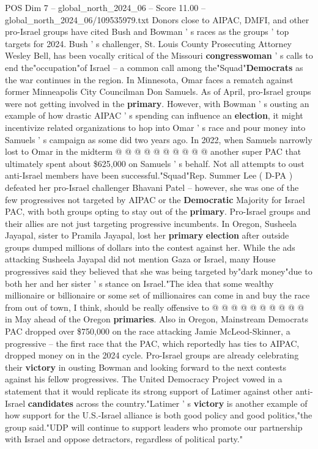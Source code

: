 \begin{textsample}{POS Dim 7 – global\_north\_2024\_06 – Score 11.00 – global\_north\_2024\_06/109535979.txt}
Donors close to AIPAC, DMFI, and other pro-Israel groups have cited Bush and Bowman ' s races as the groups ' top targets for 2024.
Bush ' s challenger, St.
Louis County Prosecuting Attorney Wesley Bell, has been vocally critical of the Missouri \textbf{congresswoman} ' s calls to end the"occupation"of Israel -- a common call among the"Squad"\textbf{Democrats} as the war continues in the region.
In Minnesota, Omar faces a rematch against former Minneapolis City Councilman Don Samuels.
As of April, pro-Israel groups were not getting involved in the \textbf{primary}.
However, with Bowman ' s ousting an example of how drastic AIPAC ' s spending can influence an \textbf{election}, it might incentivize related organizations to hop into Omar ' s race and pour money into Samuels ' s campaign as some did two years ago.
In 2022, when Samuels narrowly lost to Omar in the midterm @ @ @ @ @ @ @ @ @ @ another super PAC that ultimately spent about \$625,000 on Samuels ' s behalf.
Not all attempts to oust anti-Israel members have been successful."Squad"Rep.
Summer Lee ( D-PA ) defeated her pro-Israel challenger Bhavani Patel -- however, she was one of the few progressives not targeted by AIPAC or the \textbf{Democratic} Majority for Israel PAC, with both groups opting to stay out of the \textbf{primary}.
Pro-Israel groups and their allies are not just targeting progressive incumbents.
In Oregon, Susheela Jayapal, sister to Pramila Jayapal, lost her \textbf{primary} \textbf{election} after outside groups dumped millions of dollars into the contest against her.
While the ads attacking Susheela Jayapal did not mention Gaza or Israel, many House progressives said they believed that she was being targeted by"dark money"due to both her and her sister ' s stance on Israel."The idea that some wealthy millionaire or billionaire or some set of millionaires can come in and buy the race from out of town, I think, should be really offensive to @ @ @ @ @ @ @ @ @ @ in May ahead of the Oregon \textbf{primaries}.
Also in Oregon, Mainstream Democrats PAC dropped over \$750,000 on the race attacking Jamie McLeod-Skinner, a progressive -- the first race that the PAC, which reportedly has ties to AIPAC, dropped money on in the 2024 cycle.
Pro-Israel groups are already celebrating their \textbf{victory} in ousting Bowman and looking forward to the next contests against his fellow progressives.
The United Democracy Project vowed in a statement that it would replicate its strong support of Latimer against other anti-Israel \textbf{candidates} across the country."Latimer ' s \textbf{victory} is another example of how support for the U.S.-Israel alliance is both good policy and good politics,"the group said."UDP will continue to support leaders who promote our partnership with Israel and oppose detractors, regardless of political party."

\end{textsample}
